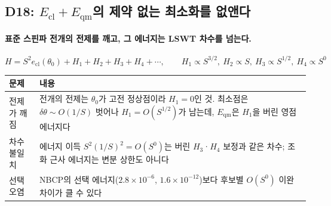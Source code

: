 \subsection{D18: $E_{\mathrm{cl}}+E_{\mathrm{qm}}$의 제약 없는 최소화를 없앤다}\label{quantum-removal}
\begingroup%
  \framesubtitle{표준 스핀파 전개의 전제를 깨고, 그 에너지는 LSWT 차수를 넘는다.}
  \[
    H = S^2 e_{\mathrm{cl}}(\theta_0) + H_1 + H_2 + H_3 + H_4 + \cdots,
    \qquad H_1 \propto S^{3/2},\ H_2 \propto S,\ H_3 \propto S^{1/2},\ H_4 \propto S^0
  \]
  \small
  \begin{tabularx}{\textwidth}{@{}P{3.3cm}Y@{}}
    \toprule
    문제 & 내용 \\
    \midrule
    전제가 깨짐 & 전개의 전제는 $\theta_0$가 고전 정상점이라 $H_1=0$인 것. 최소점은 $\delta\theta\sim O(1/S)$ 벗어나 $H_1=O(S^{1/2})$가 남는데, $E_{\mathrm{qm}}$은 $H_1$을 버린 영점 에너지다 \\
    차수 불일치 & 에너지 이득 $S^2(1/S)^2=O(S^0)$는 버린 $H_3$·$H_4$ 보정과 같은 차수; 조화 근사 에너지는 변분 상한도 아니다 \\
    선택 오염 & NBCP의 선택 에너지($2.8\times10^{-6}$, $1.6\times10^{-12}$)보다 후보별 $O(S^0)$ 이완 차이가 클 수 있다 \\
    \bottomrule
  \end{tabularx}
  \par\medskip
\endgroup


